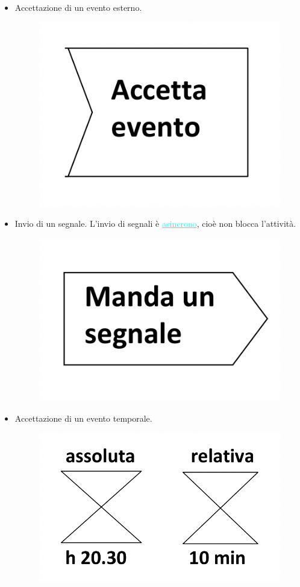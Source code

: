 \begin{itemize}
    \item Accettazione di un evento esterno.
        \begin{figure}[h]
            \centering
            \includegraphics[scale=0.30]{img/accettaevento.png}
        \end{figure}
    \item Invio di un segnale. L'invio di segnali è \textcolor{cyan}{\underline{asincrono}}, cioè non blocca l'attività.
        \begin{figure}[h]
            \centering
            \includegraphics[scale=0.30]{img/mandasegnale.png}
        \end{figure}    
    \item Accettazione di un evento temporale.
        \begin{figure}[H]
            \centering
            \includegraphics[scale=0.30]{img/tempo.png}

\end{figure}
\end{itemize}
